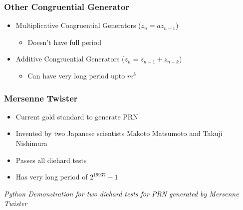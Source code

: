 \documentclass{beamer}
\begin{document}
\begin{frame}
\frametitle{Other Congruential Generator}

\begin{itemize}
\item Multiplicative Congruential Generators ($z_n = az_{n-1}$)
\begin{itemize}
\item Doesn't have full period
\end{itemize}
\item Additive Congruential Generators ($z_n = z_{n-1} + z_{n-k}$)
\begin{itemize}
\item Can have very long period upto $m^k$
\end{itemize}

\end{itemize}

\end{frame}



\begin{frame}
\frametitle{Mersenne Twister}

\begin{itemize}
\item Current gold standard to generate PRN
\item Invented by two Japanese scientists Makoto Matsumoto and Takuji Nishimura
\item Passes all diehard tests 
\item Has very long period of $2^{19937} - 1$

\end{itemize}
\textit{Python Demonstration for two diehard tests for PRN generated by Mersenne Twister}
\end{frame}
\end{document}
